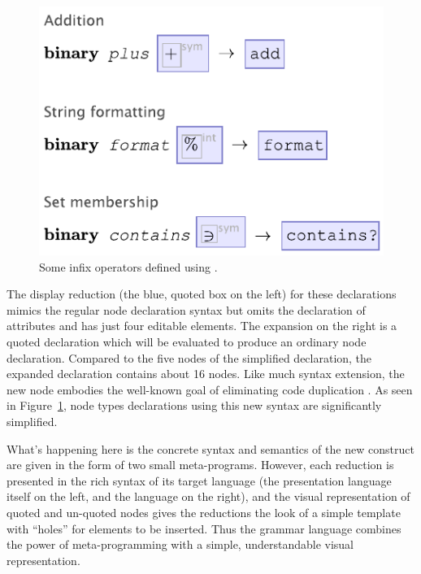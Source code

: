 \begin{figure}[t]
	\centering
	
	\includegraphics[scale=0.8]{src/image/binary.pdf}

  \caption{Some infix operators defined using .}
  \label{fig-binary-examples}
\end{figure}

The display reduction (the blue, quoted box on the left) for these declarations mimics the regular node declaration syntax but omits the declaration of attributes and has just four editable elements. The expansion on the right is a quoted declaration which will be evaluated to produce an ordinary node declaration. Compared to the five nodes of the simplified declaration, the expanded declaration contains about 16 nodes. Like much syntax extension, the new node embodies the well-known goal of eliminating code duplication \cite{dry}. As seen in Figure~\ref{fig-binary-examples}, node types declarations using this new syntax are significantly simplified.

What's happening here is the concrete syntax and semantics of the new construct are given in the form of two small meta-programs. However, each reduction is presented in the rich syntax of its target language (the  presentation language itself on the left, and the  language on the right), and the visual representation of quoted and un-quoted nodes gives the reductions the look of a simple template with ``holes'' for elements to be inserted. Thus the grammar language combines the power of meta-programming with a simple, understandable visual representation.


